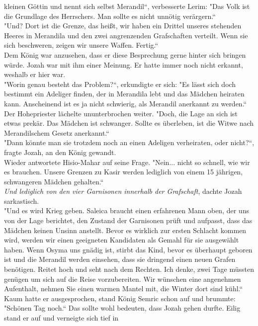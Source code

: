 kleinen Göttin und nennt sich selbst Merandil``, verbesserte Lerim: "Das Volk ist die Grundlage des 
Herrschers. Man sollte es nicht unnötig verärgern.``\\
"Und? Dort ist die Grenze, das heißt, wir haben ein Drittel unseres stehenden Heeres in Merandila 
und den zwei angrenzenden Grafschaften verteilt. Wenn sie sich beschweren, zeigen wir unsere 
Waffen. Fertig.``\\
Dem König war anzusehen, dass er diese Besprechung gerne hinter sich bringen würde. Jozah war mit 
ihm einer Meinung. Er hatte immer noch nicht erkannt, weshalb er hier war.\\
"Worin genau besteht das Problem?``, erkundigte er sich: "Es lässt sich doch bestimmt ein Adeliger 
finden, der in Merandila lebt und das Mädchen heiraten kann. Anscheinend ist es ja nicht schwierig, 
als Merandil anerkannt zu werden.``\\
Der Hohepriester lächelte ununterbrochen weiter. "Doch, die Lage an sich ist etwas prekär. Das 
Mädchen ist schwanger. Sollte es überleben, ist die Witwe nach Merandilschem Gesetz anerkannt.``\\
"Dann könnte man sie trotzdem noch an einen Adeligen verheiraten, oder nicht?``, fragte Jozah, an 
den König gewandt.\\
Wieder antwortete Hisio-Mahar auf seine Frage. "Nein... nicht so schnell, wie wir es brauchen. 
Unsere Grenzen zu Kasir werden lediglich von einem 15 jährigen, schwangeren Mädchen gehalten.``\\
\textit{Und lediglich von den vier Garnisonen innerhalb der Grafschaft}, dachte Jozah sarkastisch.\\
"Und es wird Krieg geben. Saleica braucht einen erfahrenen Mann oben, der uns von der Lage 
berichtet, den Zustand der Garnisonen prüft und aufpasst, dass das Mädchen keinen Unsinn anstellt. 
Bevor es wirklich zur ersten Schlacht kommen wird, werden wir einen geeigneten Kandidaten als 
Gemahl für sie ausgewählt haben. Wenn Osyma uns gnädig ist, stirbt das Kind, bevor es überhaupt 
geboren ist und die Merandil werden einsehen, dass sie dringend einen neuen Grafen benötigen. Reitet 
hoch und seht nach dem Rechten. Ich denke, zwei Tage müssten genügen um sich auf die Reise 
vorzubereiten. Wir wünschen eine angenehmen Aufenthalt, nehmen Sie einen warmen Mantel mit, die 
Winter dort sind kühl.``\\
Kaum hatte er ausgesprochen, stand König Semric schon auf und brummte: "Schönen Tag noch.``
Das sollte wohl bedeuten, dass Jozah gehen durfte. Eilig stand er auf und verneigte sich tief in 
